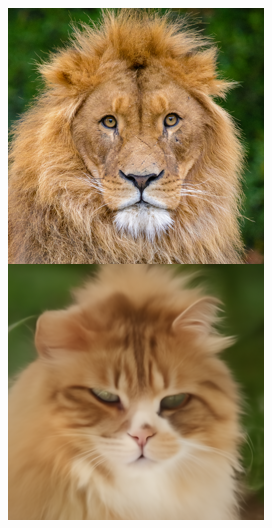 \documentclass{article}
\begin{document}
\begin{figure}
\begin{minipage}[t]{0.48\textwidth}
        \begin{minipage}[t]{0.19\textwidth}
            \includegraphics[width=\linewidth]{img/afhq_main/afhq256_bwd_3.png}
        \end{minipage}
        \begin{minipage}[t]{0.19\textwidth}

\end{minipage}
\end{minipage}
\end{figure}
\end{document}
